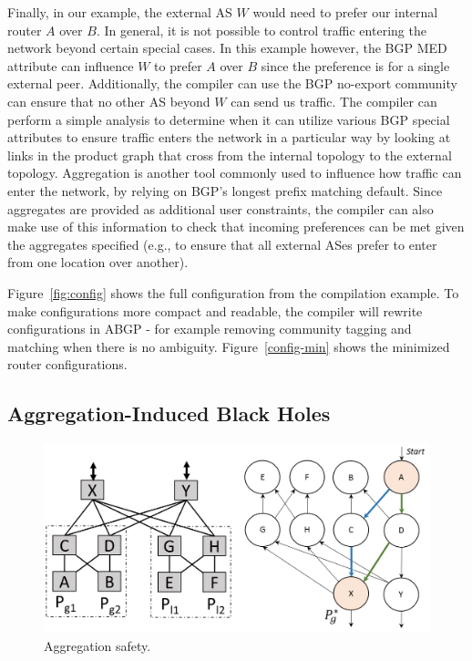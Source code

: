 Finally, in our example, the external AS $W$ would need to prefer our internal router $A$ over $B$. In general, it is not possible to control traffic entering the network beyond certain special cases. In this example however, the BGP MED attribute can influence $W$ to prefer $A$ over $B$ since the preference is for a single external peer.  Additionally, the compiler can use the BGP no-export community can ensure that no other AS beyond $W$ can send us traffic. The compiler can perform a simple analysis to determine when it can utilize various BGP special attributes to ensure traffic enters the network in a particular way by looking at links in the product graph that cross from the internal topology to the external topology. Aggregation is another tool commonly used to influence how traffic can enter the network, by relying on BGP's longest prefix matching default. Since aggregates are provided as additional user constraints, the compiler can also make use of this information to check that incoming preferences can be met given the aggregates specified (e.g., to ensure that all external ASes prefer to enter from one location over another). 

Figure~\ref{fig:config} shows the full configuration from the compilation example. To make configurations more compact and readable, the \sysname compiler will rewrite configurations in ABGP - for example removing community tagging and matching when there is no ambiguity. Figure~\ref{config-min} shows the minimized router configurations.



\subsection{Aggregation-Induced Black Holes}

\begin{figure}[t!]
\centering
\includegraphics[width=\columnwidth]{figures/aggregation}
\caption{Aggregation safety.}
\label{fig:aggregation-safety}
\end{figure}

